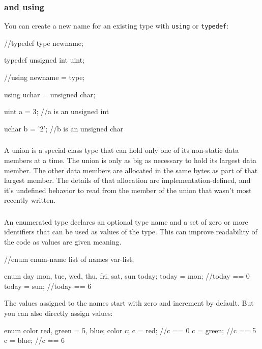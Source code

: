 \documentclass[10pt,a4paper]{scrartcl}
\begin{document}
\begin{multicols*}{2}
\subsubsection{ and using}

You can create a new name for an existing type with \verb+using+ or \verb+typedef+:

\begin{TPCpp}
//typedef type newname;

typedef unsigned int uint;

//using newname = type;

using uchar = unsigned char;

uint a = 3; //a is an unsigned int

uchar b = '2'; //b is an unsigned char
\end{TPCpp}

\subsubsection{}

A union is a special class type that can hold only one of its non-static data members at a time. The union is only as big as necessary to hold its largest data member. The other data members are allocated in the same bytes as part of that largest member. The details of that allocation are implementation-defined, and it's undefined behavior to read from the member of the union that wasn't most recently written.

\subsubsection{}

An enumerated type declares an optional type name and a set of zero or more identifiers that can be used as values of the type. This can improve readability of the code as values are given meaning.

\begin{TPCpp}
//enum enum-name {list of names} var-list;

enum day {mon, tue, wed, thu, fri, sat, sun} today;
today = mon; //today == 0
today = sun; //today == 6
\end{TPCpp}

The values assigned to the names start with zero and increment by default. But you can also directly assign values:

\begin{TPCpp}
enum color {red, green = 5, blue};
color c;
c = red;    //c == 0
c = green;  //c == 5
c = blue;   //c == 6
\end{TPCpp}


\end{multicols*}
\end{document}
